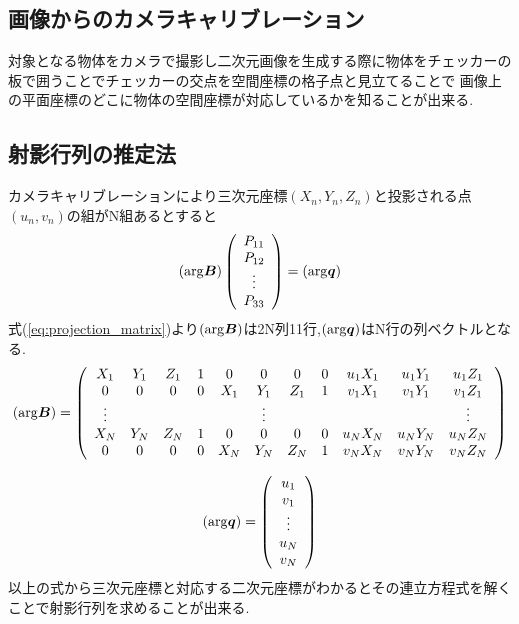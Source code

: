 \documentclass[11pt,a4j]{jsarticle}
\begin{document}
    \subsection{画像からのカメラキャリブレーション}
    対象となる物体をカメラで撮影し二次元画像を生成する際に物体をチェッカーの板で囲うことでチェッカーの交点を空間座標の格子点と見立てることで
    画像上の平面座標のどこに物体の空間座標が対応しているかを知ることが出来る.
    \subsection{射影行列の推定法}
    カメラキャリブレーションにより三次元座標$(X_n,Y_n,Z_n)$と投影される点$(u_n,v_n)$の組がN組あるとすると
    \begin{equation}
        ({\rm arg}\bm{B}) \left(
        \begin{array}{c}
            P_{11} \\
            P_{12} \\
            \vdots \\
            P_{33}
        \end{array}
        \right)
         = ({\rm arg}\bm{q})
    \end{equation}
    式(\ref{eq:projection_matrix})より$({\rm arg}\bm{B})$は2N列11行,$({\rm arg}\bm{q})$はN行の列ベクトルとなる.
    \begin{equation}
        ({\rm arg}\bm{B})= \left(
    \begin{array}{ccccccccccc}
      X_1 & Y_1 & Z_1 & 1 &0 & 0 & 0 & 0 &u_1X_1 & u_1Y_1 & u_1Z_1\\
      0 & 0 & 0 & 0 &X_1 & Y_1 & Z_1 & 1 &v_1X_1 & v_1Y_1 & v_1Z_1\\
      \vdots &&&&& \vdots &&&&& \vdots \\
      X_N & Y_N & Z_N & 1 &0 & 0 & 0 & 0 &u_NX_N & u_NY_N & u_NZ_N\\
      0 & 0 & 0 & 0 &X_N & Y_N & Z_N & 1 &v_NX_N & v_NY_N & v_NZ_N
    \end{array}
        \right)
        \label{eq:argB}
    \end{equation}

    \begin{equation}
        ({\rm arg}\bm{q}) = \left(
        \begin{array}{c}
            u_1 \\
            v_1 \\
            \vdots \\
            u_N \\
            v_N
        \end{array}
        \right)
        \label{eq:argq}
    \end{equation}
    以上の式から三次元座標と対応する二次元座標がわかるとその連立方程式を解くことで射影行列を求めることが出来る.
\end{document}
